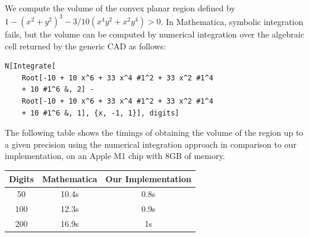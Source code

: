 \documentclass[sigconf, nonacm]{acmart} %
\begin{document}
\begin{example}\label{eg:mathematica2}
    We compute the volume of the convex planar region defined by
    $1 - (x^2 + y^2)^3 - 3/10(x^4y^2 + x^2y^4)>0$.
    In Mathematica, symbolic integration fails, but the volume can be computed by numerical integration over the  algebraic cell returned by the generic CAD as follows:
    \begin{lstlisting}
N[Integrate[
    Root[-10 + 10 x^6 + 33 x^4 #1^2 + 33 x^2 #1^4 
    + 10 #1^6 &, 2] - 
    Root[-10 + 10 x^6 + 33 x^4 #1^2 + 33 x^2 #1^4 
    + 10 #1^6 &, 1], {x, -1, 1}], digits]
    \end{lstlisting}
    
    The following table shows the timings of obtaining the volume of the region up to a given precision using the numerical integration approach in comparison to our implementation, on an Apple M1 chip with 8GB of memory. 
    
    \begin{center}
    \begin{tabular}{ |c|c|c| } 
     \hline
     Digits & Mathematica & 
     Our Implementation \\ 
     \hline
     50 & 10.4s & 0.8s \\ 
     100 & 12.3s & 0.9s \\ 
     200 & 16.9s & 1s \\ 
     \hline
    \end{tabular}
    \end{center}
    
\end{example}
\end{document}
